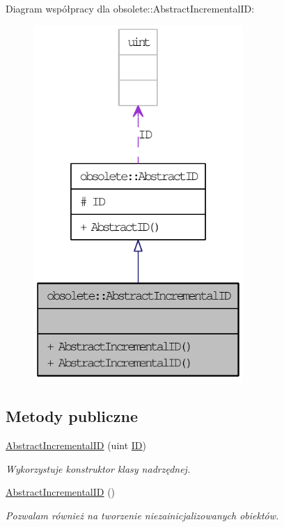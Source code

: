 Diagram współpracy dla obsolete::AbstractIncrementalID:\nopagebreak
\begin{figure}[H]
\begin{center}
\leavevmode
\includegraphics[width=226pt]{classobsolete_1_1AbstractIncrementalID__coll__graph}
\end{center}
\end{figure}
\subsection*{Metody publiczne}
\begin{DoxyCompactItemize}
\item 
\hyperlink{classobsolete_1_1AbstractIncrementalID_a7977c3993208ff1ff91b36bbc7aed925}{AbstractIncrementalID} (uint \hyperlink{classobsolete_1_1ID}{ID})
\begin{DoxyCompactList}\small\item\em Wykorzystuje konstruktor klasy nadrzędnej. \item\end{DoxyCompactList}\item 
\hyperlink{classobsolete_1_1AbstractIncrementalID_a6f379264ad7fa66c1a4be8d14214497b}{AbstractIncrementalID} ()
\begin{DoxyCompactList}\small\item\em Pozwalam również na tworzenie niezainicjalizowanych obiektów. \item\end{DoxyCompactList}\end{DoxyCompactItemize}

